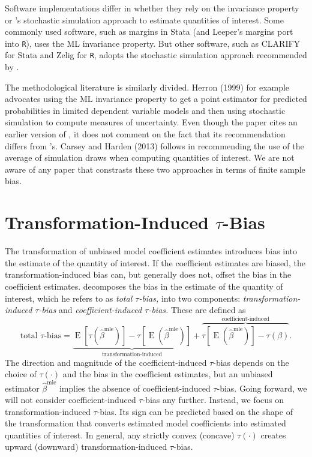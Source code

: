 \documentclass[11pt]{article}
\DeclareMathOperator*{\E}{\text{E}}
\begin{document}
Software implementations differ in whether they rely on the invariance property or \cite{KingTomzWittenberg2000}'s stochastic simulation approach to estimate quantities of interest. Some commonly used software, such as margins in Stata (and Leeper's margins port into \texttt{R}), uses the ML invariance property. But other software, such as CLARIFY for Stata and Zelig for \texttt{R}, adopts the stochastic simulation approach recommended by \cite{KingTomzWittenberg2000}.

The methodological literature is similarly divided. Herron (1999) for example advocates using the ML invariance property to get a point estimator for predicted probabilities in limited dependent variable models and then using stochastic simulation to compute measures of uncertainty. Even though the paper cites an earlier version of \cite{KingTomzWittenberg2000}, it does not comment on the fact that its recommendation differs from \cite{KingTomzWittenberg2000}'s. Carsey and Harden (2013) follows \cite{KingTomzWittenberg2000} in recommending the use of the average of simulation draws when computing quantities of interest. We are not aware of any paper that constrasts these two approaches in terms of finite sample bias. 

\section*{Transformation-Induced $\tau$-Bias}

The transformation of unbiased model coefficient estimates introduces bias into the estimate of the quantity of interest. If the coefficient estimates are biased, the transformation-induced bias can, but generally does not, offset the bias in the coefficient estimates. \citet[p. 404]{Rainey2017} decomposes the bias in the estimate of the quantity of interest, which he refers to as {\it total $\tau$-bias,} into two components: {\it transformation-induced $\tau$-bias} and {\it coefficient-induced $\tau$-bias.} These are defined as
\begin{equation}
\text{total } \tau\text{-bias}= \underbrace{ \E[\tau(\hat{\beta}^\text{mle})]-  \tau[\E(\hat{\beta}^\text{mle})]  }_{\text{transformation-induced}} + \overbrace{  \tau[\E(\hat{\beta}^\text{mle})] - \tau(\beta)  }^{\text{coefficient-induced}}\text{.} \label{eqn:ti-bias}
\end{equation}
The direction and magnitude of the coefficient-induced $\tau$-bias depends on the choice of $\tau(\cdot)$ and the bias in the coefficient estimates, but an unbiased estimator $\hat{\beta}^\text{mle}$ implies the absence of coefficient-induced $\tau$-bias. Going forward, we will not consider coefficient-induced $\tau$-bias any further. Instead, we focus on transformation-induced $\tau$-bias. Its sign can be predicted based on the shape of the transformation that converts estimated model coefficients into estimated quantities of interest. In general, any strictly convex (concave) $\tau(\cdot)$ creates upward (downward) transformation-induced $\tau$-bias.
\end{document}
